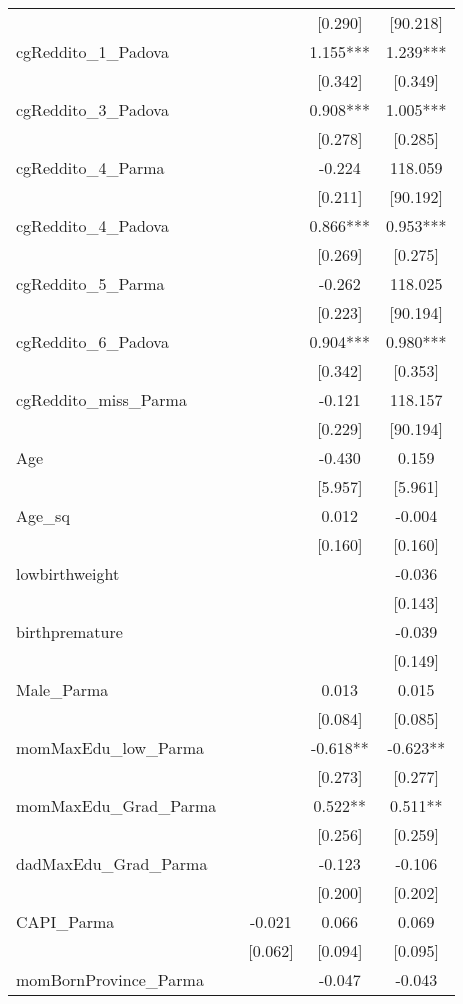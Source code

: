 \documentclass[]{article}
\begin{document}
\begin{tabular}{lcccc}
 &  &  & [0.290] & [90.218] \\
cgReddito\_1\_Padova &  &  & 1.155*** & 1.239*** \\
 &  &  & [0.342] & [0.349] \\
cgReddito\_3\_Padova &  &  & 0.908*** & 1.005*** \\
 &  &  & [0.278] & [0.285] \\
cgReddito\_4\_Parma &  &  & -0.224 & 118.059 \\
 &  &  & [0.211] & [90.192] \\
cgReddito\_4\_Padova &  &  & 0.866*** & 0.953*** \\
 &  &  & [0.269] & [0.275] \\
cgReddito\_5\_Parma &  &  & -0.262 & 118.025 \\
 &  &  & [0.223] & [90.194] \\
cgReddito\_6\_Padova &  &  & 0.904*** & 0.980*** \\
 &  &  & [0.342] & [0.353] \\
cgReddito\_miss\_Parma &  &  & -0.121 & 118.157 \\
 &  &  & [0.229] & [90.194] \\
Age &  &  & -0.430 & 0.159 \\
 &  &  & [5.957] & [5.961] \\
Age\_sq &  &  & 0.012 & -0.004 \\
 &  &  & [0.160] & [0.160] \\
lowbirthweight &  &  &  & -0.036 \\
 &  &  &  & [0.143] \\
birthpremature &  &  &  & -0.039 \\
 &  &  &  & [0.149] \\
Male\_Parma &  &  & 0.013 & 0.015 \\
 &  &  & [0.084] & [0.085] \\
momMaxEdu\_low\_Parma &  &  & -0.618** & -0.623** \\
 &  &  & [0.273] & [0.277] \\
momMaxEdu\_Grad\_Parma &  &  & 0.522** & 0.511** \\
 &  &  & [0.256] & [0.259] \\
dadMaxEdu\_Grad\_Parma &  &  & -0.123 & -0.106 \\
 &  &  & [0.200] & [0.202] \\
CAPI\_Parma &  & -0.021 & 0.066 & 0.069 \\
 &  & [0.062] & [0.094] & [0.095] \\
momBornProvince\_Parma &  &  & -0.047 & -0.043 \\

\end{tabular}
\end{document}
